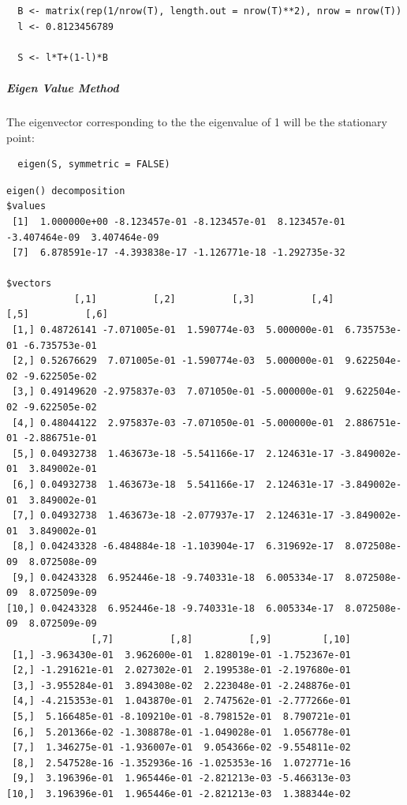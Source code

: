 \documentclass[11pt]{article}
\begin{document}
\begin{verbatim}
  B <- matrix(rep(1/nrow(T), length.out = nrow(T)**2), nrow = nrow(T))
  l <- 0.8123456789

  S <- l*T+(1-l)*B
\end{verbatim}

\subparagraph{Eigen Value Method}
\label{eigen-value-method}
The eigenvector corresponding to the the eigenvalue of 1 will be the
stationary point:

\begin{verbatim}
  eigen(S, symmetric = FALSE)
\end{verbatim}

\begin{verbatim}
eigen() decomposition
$values
 [1]  1.000000e+00 -8.123457e-01 -8.123457e-01  8.123457e-01 -3.407464e-09  3.407464e-09
 [7]  6.878591e-17 -4.393838e-17 -1.126771e-18 -1.292735e-32

$vectors
            [,1]          [,2]          [,3]          [,4]          [,5]          [,6]
 [1,] 0.48726141 -7.071005e-01  1.590774e-03  5.000000e-01  6.735753e-01 -6.735753e-01
 [2,] 0.52676629  7.071005e-01 -1.590774e-03  5.000000e-01  9.622504e-02 -9.622505e-02
 [3,] 0.49149620 -2.975837e-03  7.071050e-01 -5.000000e-01  9.622504e-02 -9.622505e-02
 [4,] 0.48044122  2.975837e-03 -7.071050e-01 -5.000000e-01  2.886751e-01 -2.886751e-01
 [5,] 0.04932738  1.463673e-18 -5.541166e-17  2.124631e-17 -3.849002e-01  3.849002e-01
 [6,] 0.04932738  1.463673e-18  5.541166e-17  2.124631e-17 -3.849002e-01  3.849002e-01
 [7,] 0.04932738  1.463673e-18 -2.077937e-17  2.124631e-17 -3.849002e-01  3.849002e-01
 [8,] 0.04243328 -6.484884e-18 -1.103904e-17  6.319692e-17  8.072508e-09  8.072508e-09
 [9,] 0.04243328  6.952446e-18 -9.740331e-18  6.005334e-17  8.072508e-09  8.072509e-09
[10,] 0.04243328  6.952446e-18 -9.740331e-18  6.005334e-17  8.072508e-09  8.072509e-09
               [,7]          [,8]          [,9]         [,10]
 [1,] -3.963430e-01  3.962600e-01  1.828019e-01 -1.752367e-01
 [2,] -1.291621e-01  2.027302e-01  2.199538e-01 -2.197680e-01
 [3,] -3.955284e-01  3.894308e-02  2.223048e-01 -2.248876e-01
 [4,] -4.215353e-01  1.043870e-01  2.747562e-01 -2.777266e-01
 [5,]  5.166485e-01 -8.109210e-01 -8.798152e-01  8.790721e-01
 [6,]  5.201366e-02 -1.308878e-01 -1.049028e-01  1.056778e-01
 [7,]  1.346275e-01 -1.936007e-01  9.054366e-02 -9.554811e-02
 [8,]  2.547528e-16 -1.352936e-16 -1.025353e-16  1.072771e-16
 [9,]  3.196396e-01  1.965446e-01 -2.821213e-03 -5.466313e-03
[10,]  3.196396e-01  1.965446e-01 -2.821213e-03  1.388344e-02

\end{verbatim}
\end{document}
